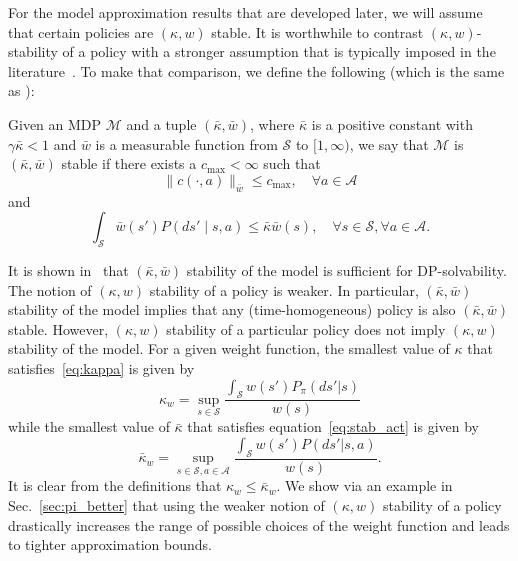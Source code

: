 \documentclass[letterpaper, 10pt]{IEEEtran}
\newcommand*\ALPHABET{\mathcal}
\newcommand*\tuple{\kappa, w}
\begin{document}
For the model approximation results that are developed later, we will assume that certain policies are $(\tuple)$ stable. It is worthwhile to contrast $(\tuple)$-stability of a policy with a stronger assumption that is typically imposed in the literature~\cite{muller1997,saldi2017asymptotic,hernandez2012discrete,hernandez2012further}. To make that comparison, we define the following (which is the same as \cite[Assumption~8.3.2]{hernandez2012further}):
\begin{definition}\label{def:model-stability}
   Given an MDP $\ALPHABET M$ and a tuple $(\bar \kappa, \bar w)$, where 
   $\bar \kappa$ is a positive constant with $\gamma \bar \kappa < 1$ and $\bar w$ is a measurable function from $\ALPHABET S$ to $[1, \infty)$, we say that  $\ALPHABET M$ is $(\bar \kappa, \bar w)$ stable if there exists a $c_{\max} < \infty$ such that
   \begin{equation}\label{eq:c-pi-bar}
        \| c(\cdot, a) \|_{\bar w} \le c_{\max}, \quad \forall a \in \ALPHABET A
   \end{equation}
   and
   \begin{equation}
    \int_{\ALPHABET S} \bar w(s') P(ds' \mid s,a) 
    \le 
    \bar\kappa \bar w(s),
    \quad \forall s \in \ALPHABET S, \forall a \in \ALPHABET A.
    \label{eq:stab_act}  
   \end{equation}
\end{definition}

\begin{remark}\label{rem:pi-better}
It is shown in~\cite{hernandez2012further} that $(\bar \kappa, \bar w)$ stability of the model is sufficient for DP-solvability. The notion of $(\tuple)$ stability of a policy is weaker. In particular, $(\bar \kappa, \bar w)$ stability of the model implies that any (time-homogeneous) policy is also $(\bar \kappa, \bar w)$ stable. However, $( \kappa,  w)$ stability of a particular policy does not imply $( \kappa,  w)$ stability of the model.  For a given weight function, the smallest value of $\kappa$ that satisfies~\eqref{eq:kappa} is given by
\begin{equation}\label{eq:kappa-bound}
    \kappa_w = \sup_{s \in \ALPHABET S} \frac{\int_{\ALPHABET S} w(s') P_\pi(ds'|s) }{w(s)}
\end{equation}
while the smallest value of $\bar \kappa$ that satisfies equation~\eqref{eq:stab_act} is given by
\begin{equation}\label{eq:bar-kappa-bound}
    \bar \kappa_w = \sup_{s \in \ALPHABET S, a \in \ALPHABET A} \frac{\int_{\ALPHABET S} w(s') P(ds'|s,a) }{w(s)}.
\end{equation}
It is clear from the definitions that $\kappa_w \le \bar \kappa_w$.
We show via an example in Sec.~\ref{sec:pi_better} that using the weaker notion of $(\tuple)$ stability of a policy drastically increases the range of  possible choices of the weight function and leads to tighter approximation bounds.  
\end{remark}
\end{document}
